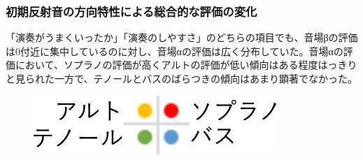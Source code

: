 \documentclass[11pt,a4j]{jreport}
\begin{document}
\newpage
\subsubsection*{初期反射音の方向特性による総合的な評価の変化}
「演奏がうまくいったか」「演奏のしやすさ」のどちらの項目でも、音場βの評価は0付近に集中しているのに対し、音場αの評価は広く分布していた。音場αの評価において、ソプラノの評価が高くアルトの評価が低い傾向はある程度はっきりと見られた一方で、テノールとバスのばらつきの傾向はあまり顕著でなかった。


\begin{figure}[H]
  \begin{minipage}{1\linewidth}
    \centering
    \includegraphics[scale=.7]{images/subjectiveExp/scat_0_legend.jpg}
  \end{minipage}


\end{figure}
\end{document}
